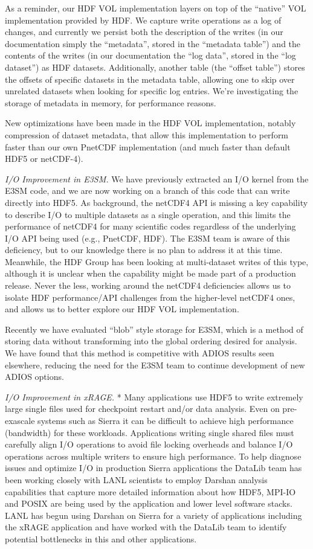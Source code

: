 As a reminder, our HDF VOL implementation layers on top of the “native” VOL
implementation provided by HDF. We capture write operations as a log of
changes, and currently we persist both the description of the writes (in our
documentation simply the “metadata”, stored in the “metadata table”) and the
contents of the writes (in our documentation the “log data”, stored in the “log
dataset”) as HDF datasets. Additionally, another table (the “offset table”)
stores the offsets of specific datasets in the metadata table, allowing one to
skip over unrelated datasets when looking for specific log entries. We’re
investigating the storage of metadata in memory, for performance reasons.

New optimizations have been made in the HDF VOL implementation, notably compression
of dataset metadata, that allow this implementation to perform faster than our
own PnetCDF implementation (and much faster than default HDF5 or netCDF-4).

\emph{I/O Improvement in E3SM.}
%
We have previously extracted an I/O kernel from the E3SM code, and
we are now working on a branch of this code that can write directly
into HDF5. As background, the netCDF4 API is missing a key capability
to describe I/O to multiple datasets as a single operation, and
this limits the performance of netCDF4 for many scientific codes
regardless of the underlying I/O API being used (e.g., PnetCDF,
HDF). The E3SM team is aware of this deficiency, but to our knowledge
there is no plan to address it at this time.  Meanwhile, the HDF
Group has been looking at multi-dataset writes of this type, although
it is unclear when the capability might be made part of a production
release. Never the less, working around the netCDF4 deficiencies
allows us to isolate HDF performance/API challenges from the
higher-level netCDF4 ones, and allows us to better explore our HDF
VOL implementation.

Recently we have evaluated ``blob'' style storage for E3SM, which
is a method of storing data without transforming into the global
ordering desired for analysis. We have found that this method is
competitive with ADIOS results seen elsewhere, reducing the need
for the E3SM team to continue development of new ADIOS options.

\emph{I/O Improvement in xRAGE.}
*
Many applications use HDF5 to write extremely large
single files used for checkpoint restart and/or data analysis. Even on
pre-exascale systems such as Sierra it can be difficult to achieve high
performance (bandwidth) for these workloads. Applications writing single shared
files must carefully align I/O operations to avoid file locking overheads and
balance I/O operations across multiple writers to ensure high performance. To
help diagnose issues and optimize I/O in production Sierra applications the
DataLib team has been working closely with LANL scientists to employ Darshan
analysis capabilities that capture more detailed information about how HDF5,
MPI-IO and POSIX are being used by the application and lower level software
stacks. LANL has begun using Darshan on Sierra for a variety of applications
including the xRAGE application and have worked with the DataLib team to
identify potential bottlenecks in this and other applications.

